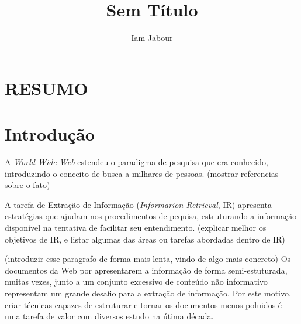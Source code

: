 \documentclass{acm_proc_article-sp}
\numberwithin{equation}{section}
\begin{document}
\title{Sem Título}

\author{
\alignauthor
Iam Jabour  
\and \alignauthor {}
}


\maketitle

\begin{abstract}


\end{abstract}

\section*{RESUMO}\normalsize %







\section{Introdução}

A {\it World Wide Web} estendeu o paradigma de pesquisa que era conhecido, 
	introduzindo o conceito de busca a milhares de pessoas. (mostrar
  referencias sobre o fato)


A tarefa de Extração de Informação ({\it Informarion Retrieval}, IR) apresenta 
	estratégias que ajudam nos procedimentos de pequisa, estruturando a 
	informação disponível na tentativa de facilitar seu entendimento.
  (explicar melhor os objetivos de IR, e listar algumas das áreas ou
  tarefas abordadas dentro de IR)

(introduzir esse paragrafo de forma mais lenta, vindo de algo mais
concreto)
Os documentos da Web por apresentarem a informação de forma semi-estuturada,
	muitas vezes, junto a um conjunto excessivo de conteúdo não informativo
	representam um grande desafio para a extração de informação. 
Por este motivo,
	criar técnicas capazes de estruturar e tornar os documentos menos poluidos
	é uma tarefa de valor com diversos estudo na útima década.
\end{document}
